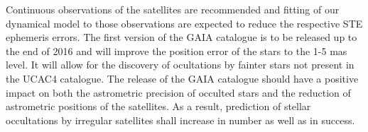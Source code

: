 Continuous observations of the satellites are recommended and fitting of our dynamical model to those observations are expected to reduce the respective STE ephemeris errors. The first version of the GAIA catalogue is to be released up to the end of 2016 and will improve the position error of the stars to the 1-5 mas level. It will allow for the discovery of ocultations by fainter stars not present in the UCAC4 catalogue. %
The release of the GAIA catalogue should have a positive impact on both the astrometric precision of occulted stars and the reduction of astrometric positions of the satellites. As a result, prediction of stellar occultations by irregular satellites shall increase in number as well as in success.




